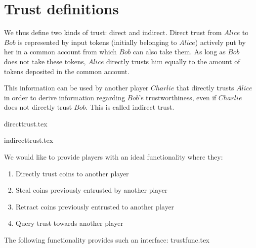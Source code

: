 \section{Trust definitions}
  We thus define two kinds of trust: direct and indirect. Direct trust from $Alice$ to $Bob$ is represented by input tokens
  (initially belonging to $Alice$) actively put by her in a common account from which $Bob$ can also take them. As long as
  $Bob$ does not take these tokens, $Alice$ directly trusts him equally to the amount of tokens deposited in the common
  account.
  
  This information can be used by another player $Charlie$ that directly trusts $Alice$ in order to derive information
  regarding $Bob$'s trustworthiness, even if $Charlie$ does not directly trust $Bob$. This is called indirect trust.

  {directtrust.tex}

  {indirecttrust.tex}

  We would like to provide players with an ideal functionality where they:
  \begin{enumerate}
    \item Directly trust coins to another player
    \item Steal coins previously entrusted by another player
    \item Retract coins previously entrusted to another player
    \item Query trust towards another player
  \end{enumerate}
  The following functionality provides such an interface:
  {trustfunc.tex}
